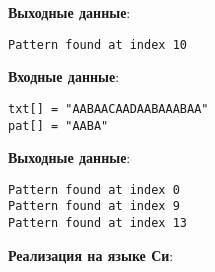 \vspace{\baselineskip}

\textbf{Выходные данные}:

\vspace{\baselineskip}

\begin{tcolorbox}
\begin{verbatim}
Pattern found at index 10
\end{verbatim}
\end{tcolorbox}

\vspace{\baselineskip}

\textbf{Входные данные}:

\vspace{\baselineskip}

\begin{tcolorbox}
\begin{verbatim}
txt[] = "AABAACAADAABAAABAA"
pat[] = "AABA"
\end{verbatim}
\end{tcolorbox}

\vspace{\baselineskip}

\textbf{Выходные данные}:

\vspace{\baselineskip}

\begin{tcolorbox}
\begin{verbatim}
Pattern found at index 0
Pattern found at index 9
Pattern found at index 13
\end{verbatim}
\end{tcolorbox}

\vspace{\baselineskip}

\textbf{Реализация на языке Си}:

